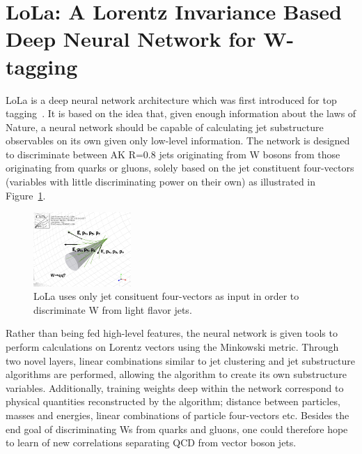 \section{LoLa: A Lorentz Invariance Based Deep Neural Network for W-tagging}
LoLa is a deep neural network architecture which was first introduced for top tagging~\cite{Butter:2017cot}. It is based on the idea that, given enough information about the laws of Nature, a neural network should be capable of calculating jet substructure observables on its own given only low-level information. The network is designed to discriminate between AK R=0.8 jets originating from W bosons from those originating from quarks or gluons, solely based on the jet constituent four-vectors (variables with little discriminating power on their own) as illustrated in Figure~\ref{fig:lola:4vec}.
\begin{figure}[h!]
\centering
\includegraphics[width=0.33\textwidth]{figures/vtagging/misc/4vec.png}
\caption{LoLa uses only jet consituent four-vectors as input in order to discriminate W from light flavor jets.}
\label{fig:lola:4vec}
\end{figure}
Rather than being fed high-level features, the neural network is given tools to perform calculations on Lorentz vectors using the Minkowski metric. Through two novel layers, linear combinations similar to jet clustering and jet substructure algorithms are performed, allowing the algorithm to create its own substructure variables. Additionally, training weights deep within the network correspond to physical quantities reconstructed by the algorithm; distance between particles, masses and energies, linear combinations of particle four-vectors etc.
Besides the end goal of discriminating Ws from quarks and gluons, one could therefore hope to learn of new correlations separating QCD from vector boson jets.

